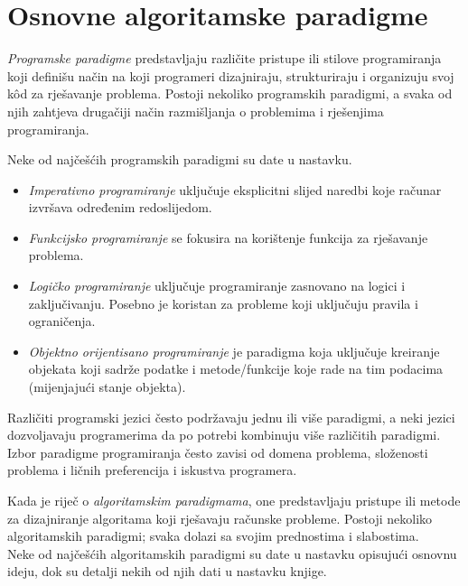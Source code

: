 \chapter{Osnovne algoritamske paradigme}

\textit{Programske paradigme} predstavljaju različite pristupe ili stilove  progra\-miranja koji definišu način na koji programeri dizajniraju, strukturiraju i organizuju  svoj k\^od za rješavanje problema. Postoji nekoliko progra\-mskih paradigmi, a svaka od njih zahtjeva  drugačiji način razmišljanja o problemima i rješenjima programiranja.

Neke od najčešćih programskih paradigmi su date u nastavku. 

\begin{itemize}
	\item \textit{Imperativno programiranje} uključuje %
	 eksplicitni slijed naredbi koje računar izvršava određenim redoslijedom.
	\item \textit{Funkcijsko programiranje} se fokusira na korištenje funkcija za rješavanje problema.  %
	\item \textit{Logičko programiranje} uključuje programiranje zasnovano na logici i zaključivanju. Posebno je koristan za probleme koji uključuju pravila i ograničenja.
	\item \textit{Objektno orijentisano programiranje} je paradigma koja uključuje kreira\-nje objekata koji sadrže  podatke i metode/funkcije koje rade na tim podacima (mijenjajući stanje objekta).
\end{itemize}


Različiti programski jezici često podržavaju jednu ili više paradigmi, a neki jezici dozvoljavaju programerima da po potrebi kombinuju  više različitih  paradigmi. Izbor paradigme programiranja često zavisi od domena problema, složenosti problema i ličnih preferencija i iskustva programera.

Kada je riječ o \textit{algoritamskim paradigmama}, one predstavljaju  pri\-stupe ili metode za dizajniranje algoritama koji rješavaju   računske probleme. Postoji nekoliko algoritamskih paradigmi; svaka  dolazi sa svojim prednostima i slabostima. \\ 


Neke od najčešćih algoritamskih paradigmi su date u nastavku opisujući osnovnu ideju, dok su detalji nekih od njih dati u nastavku knjige. 

